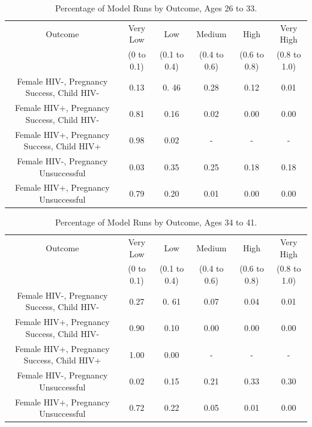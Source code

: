 \documentclass[11pt]{nih_mod}
\begin{document}
\begin{table}[H]	
\begin{center}
\begin{tabular}{|c|c|c|c|c|c|}
\hline
Outcome & Very Low& Low & Medium& High& Very High\\
 & (0 to 0.1) & (0.1 to 0.4) & (0.4 to 0.6) & (0.6 to 0.8) & (0.8 to 1.0)\\
\hline
\hline
Female HIV-, Pregnancy Success, Child HIV- & 0.13 & 0. 46 & 0.28 & 0.12 & 0.01\\
Female HIV+, Pregnancy Success, Child HIV- & 0.81 & 0.16 & 0.02 & 0.00 & 0.00\\
Female HIV+, Pregnancy Success, Child HIV+ & 0.98 & 0.02 & - & - &- \\
Female HIV-, Pregnancy Unsuccessful & 0.03 & 0.35 & 0.25 & 0.18 & 0.18 \\
Female HIV+, Pregnancy Unsuccessful & 0.79 & 0.20 & 0.01 & 0.00 & 0.00\\
\hline
\end{tabular}
	\caption{Percentage of Model Runs by Outcome, Ages 26 to 33. \label{tab:outcomefreqs26}}
\end{center}
\end{table}

\begin{table}[H]	
\begin{center}
\begin{tabular}{|c|c|c|c|c|c|}
\hline
Outcome & Very Low& Low & Medium& High& Very High\\
 & (0 to 0.1) & (0.1 to 0.4) & (0.4 to 0.6) & (0.6 to 0.8) & (0.8 to 1.0)\\
\hline
\hline
Female HIV-, Pregnancy Success, Child HIV- & 0.27 & 0. 61 & 0.07 & 0.04 & 0.01\\
Female HIV+, Pregnancy Success, Child HIV- & 0.90 & 0.10 & 0.00 & 0.00 & 0.00\\
Female HIV+, Pregnancy Success, Child HIV+ & 1.00 & 0.00 & - & - &- \\
Female HIV-, Pregnancy Unsuccessful & 0.02 & 0.15 & 0.21 & 0.33 & 0.30 \\
Female HIV+, Pregnancy Unsuccessful & 0.72 & 0.22 & 0.05 & 0.01 & 0.00\\
\hline
\end{tabular}
	\caption{Percentage of Model Runs by Outcome, Ages 34 to 41. \label{tab:outcomefreqs34}}
\end{center}
\end{table}
\end{document}
